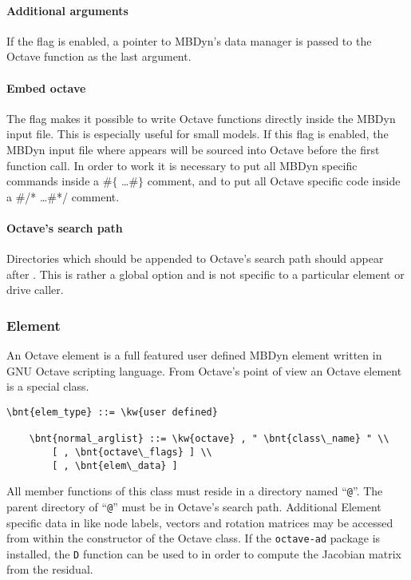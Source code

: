 \paragraph{Additional arguments}
If the flag  is enabled, a pointer to MBDyn's data manager is passed to the Octave function as the last argument.

\paragraph{Embed octave}
The flag  makes it possible to write Octave functions directly inside the MBDyn input file.
This is especially useful for small models. If this flag is enabled, the MBDyn input file where  appears will be sourced into Octave before the first function call.
In order to work it is necessary to put all MBDyn specific commands inside a $\#\lbrace$ \ldots $\#\rbrace$ comment, and to put all Octave specific code inside a \#/* \ldots \#*/ comment.

\paragraph{Octave's search path}
Directories which should be appended to Octave's search path should appear after .
This is rather a global option and is not specific to a particular element or drive caller.

\subsubsection{Element}
An Octave element is a full featured user defined MBDyn element written in GNU Octave scripting language.
From Octave's point of view an Octave element is a special class.
\begin{Verbatim}[commandchars=\\\{\}]
    \bnt{elem_type} ::= \kw{user defined}

    \bnt{normal_arglist} ::= \kw{octave} , " \bnt{class\_name} " \\
        [ , \bnt{octave\_flags} ] \\
        [ , \bnt{elem\_data} ]
\end{Verbatim}
All member functions of this class must reside in a directory named ``\texttt{@}''.
The parent directory of ``\texttt{@}'' must be in Octave's search path.
Additional Element specific data in  like node labels,
vectors and rotation matrices may be accessed from within the constructor
of the Octave class.
If the \texttt{octave-ad} package is installed,
the \texttt{D} function can be used to in order to compute
the Jacobian matrix from the residual.

